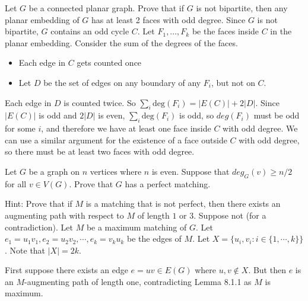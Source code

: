 \begin{enumerate}
     Let $G$ be a connected planar graph. Prove that if $G$ is not bipartite, then any planar embedding of $G$ has at least 2 faces with odd degree.
    \answer Since $G$ is not bipartite, $G$ contains an odd cycle $C$. Let $F_1, \dots, F_k$ be the faces inside $C$ in the planar embedding. Consider the sum of the degrees of the faces. 
    \begin{itemize}
        \item Each edge in $C$ gets counted once
        \item Let $D$ be the set of edges on any boundary of any $F_i$, but not on $C$. 
    \end{itemize}
    Each edge in $D$ is counted twice. So $\sum_i \mathrm{deg}(F_i) = |E(C)| + 2|D|$. Since $|E(C)|$ is odd and $2|D|$ is even, $\sum_i \mathrm{deg}(F_i)$ is odd, so $deg(F_i)$ must be odd for some $i$, and therefore we have at least one face inside $C$ with odd degree. We can use a similar argument for the existence of a face outside $C$ with odd degree, so there must be at least two faces with odd degree. 
    

     Let $G$ be a graph on $n$ vertices where $n$ is even. Suppose that $deg_G(v) \geq n/2$ for all $v \in V(G).$ Prove that $G$ has a perfect matching.

   Hint: Prove that if $M$ is a matching that is not perfect, then there exists an augmenting path with respect to $M$ of length $1$ or $3$.
    \answer 
    Suppose not (for a contradiction). Let $M$ be a maximum matching of $G$. Let $e_1 = u_1v_1, e_2 = u_2v_2, \cdots, e_k=v_ku_k$ be the edges of $M$. Let $X = \{u_i, v_i: i \in \{1, \cdots, k\}\}$. Note that $|X| = 2k$.
    
    First suppose there exists an edge $e=uv \in E(G)$ where $u, v \not \in X$. But then $e$ is an $M$-augmenting path of length one, contradicting Lemma 8.1.1 as $M$ is maximum.


\end{enumerate}
